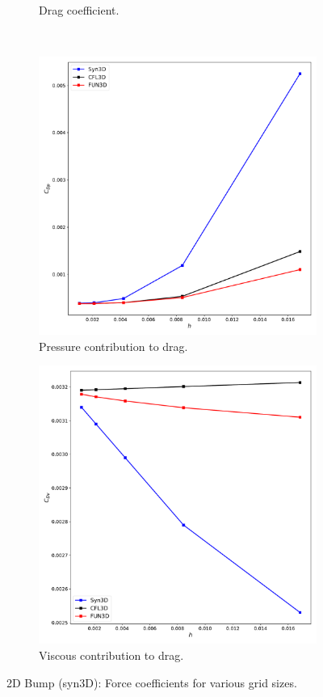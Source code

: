 \begin{figure}[ht!]
\begin{subfigure}{.45\textwidth}
  \caption{Drag coefficient.}
\end{subfigure}
\\
\begin{subfigure}{.45\textwidth}
  \centering
  \includegraphics[width=1.0\textwidth]{figs/2dbump/C_DpGridStudy.pdf}
  \caption{Pressure contribution to drag.}
\end{subfigure}%
\begin{subfigure}{.45\textwidth}
  \centering
  \includegraphics[width=1.0\textwidth]{figs/2dbump/C_DvGridStudy.pdf}
  \caption{Viscous contribution to drag.}
\end{subfigure}
\caption{2D Bump (syn3D): Force coefficients for various grid sizes.}
\label{fig:syn2dbumpforcestudy}
\end{figure}

